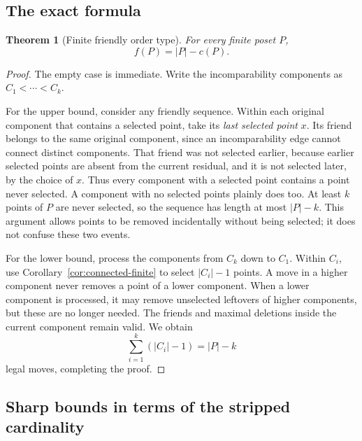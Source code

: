 \documentclass[11pt,letterpaper]{article}
\newtheorem{theorem}{Theorem}[section]
\theoremstyle{definition}
\theoremstyle{remark}
\begin{document}
\subsection{The exact formula}

\begin{theorem}[Finite friendly order type]\label{thm:finite}
For every finite poset $P$,
\begin{equation}\label{eq:finite-formula}
 \boxed{f(P)=|P|-c(P).}
\end{equation}
\end{theorem}
\begin{proof}
The empty case is immediate. Write the incomparability components as
$C_1<\cdots<C_k$.

For the upper bound, consider any friendly sequence. Within each original
component that contains a selected point, take its \emph{last selected
point} $x$. Its friend belongs to the same original component, since an
incomparability edge cannot connect distinct components. That friend was
not selected earlier, because earlier selected points are absent from the
current residual, and it is not selected later, by the choice of $x$.
Thus every component with a selected point contains a point never selected.
A component with no selected points plainly does too. At least $k$ points
of $P$ are never selected, so the sequence has length at most $|P|-k$.
This argument allows points to be removed incidentally without being
selected; it does not confuse these two events.

For the lower bound, process the components from $C_k$ down to $C_1$.
Within $C_i$, use Corollary~\ref{cor:connected-finite} to select
$|C_i|-1$ points. A move in a higher component never removes a point of
a lower component. When a lower component is processed, it may remove
unselected leftovers of higher components, but these are no longer needed.
The friends and maximal deletions inside the current component remain
valid. We obtain
\[
 \sum_{i=1}^k(|C_i|-1)=|P|-k
\]
legal moves, completing the proof.
\end{proof}

\subsection{Sharp bounds in terms of the stripped cardinality}
\end{document}
